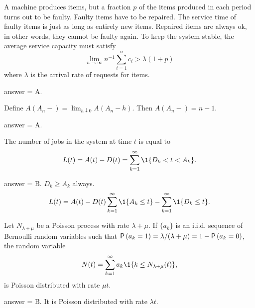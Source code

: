 \begin{exercise}[201902]
A machine produces items, but a fraction $p$ of the
items produced in each period turns out to be faulty. Faulty items have to be repaired. The service time of faulty items is just as long as entirely new items.
Repaired items are always ok, in other words, they cannot be faulty again.  To keep the system stable, the average service capacity must satisfy
  \begin{equation*}
\lim_{n\to \infty}   n^{-1}\sum_{i=1}^n c_i > \lambda (1+p)
\end{equation*}
where $\lambda$ is the arrival rate of requests for items. 
\begin{solution}
answer = A.
\end{solution}
\end{exercise}

\begin{exercise}[201902]
Define $A(A_n-) = \lim_{h\downarrow 0} A(A_n - h)$. Then $A(A_n-) = n-1$. 

\begin{solution}
answer = A.
\end{solution}
\end{exercise}

\begin{exercise}[201902]
The number of jobs in the system at time $t$ is equal to 
  \begin{equation*}
      L(t)= A(t) - D(t) = \sum_{k=1}^\infty \1{D_k < t < A_k}.
  \end{equation*}

\begin{solution}
answer = B.  $D_k \geq A_k$ always. 
  \begin{equation*}
      L(t)= A(t) - D(t) \sum_{k=1}^\infty \1{A_k \leq t} -  \sum_{k=1}^\infty \1{D_k \leq t}.
  \end{equation*}
\end{solution}
\end{exercise}

\begin{exercise}[201902]
  Let $N_{\lambda+\mu}$ be a Poisson process with rate $\lambda+\mu$. If $\{a_k\}$ is an i.i.d. sequence of Bernoulli random variables such that $\P{a_k=1} = \lambda/(\lambda+\mu)=1-\P{a_k=0}$,  the random variable
  \begin{equation*}
    N(t) = \sum_{k=1}^\infty a_k \1{k \leq N_{\lambda+\mu}(t)},
  \end{equation*}
is  Poisson distributed with rate $\mu t$. 

\begin{solution}
answer = B. It is Poisson distributed with rate $\lambda t$.
\end{solution}
\end{exercise}

